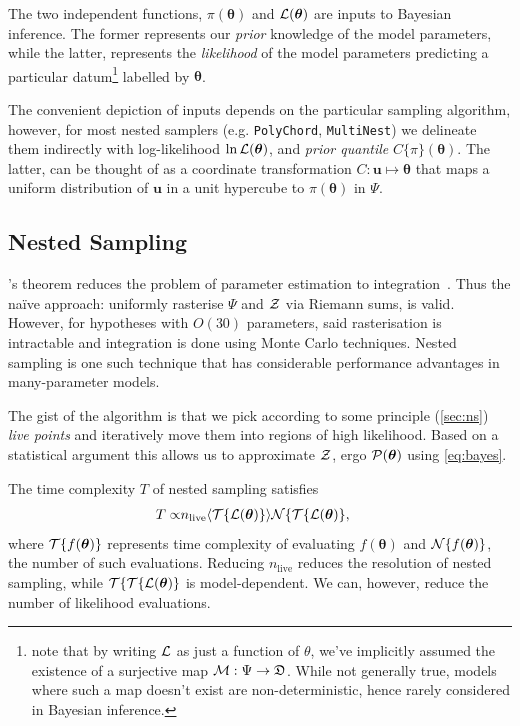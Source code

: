 \documentclass[usenatbib]{mnras}
\begin{document}
The two independent functions, \(\pi(\bm{\theta})\) and
\({\cal L}(\bm{\theta})\) are inputs to Bayesian inference. The former
represents our \emph{prior} knowledge of the model parameters, while
the latter, represents the \emph{likelihood} of the model parameters
predicting a particular datum\footnote{note that by writing ${\cal L}$
  as just a function of $\theta$, we've implicitly assumed the
  existence of a surjective map
  ${\cal M}: \Psi \rightarrow \mathfrak{D}$. While not generally true,
  models where such a map doesn't exist are non-deterministic, hence
  rarely considered in Bayesian inference. } labelled by
$\bm{\theta}$.

The convenient depiction of inputs depends on the particular sampling
algorithm, however, for most nested samplers (e.g. \texttt{PolyChord},
\texttt{MultiNest}) we delineate them indirectly with log-likelihood
\(\ln \cal L (\bm{\theta})\), and \emph{prior quantile}
\(C\{\pi\}(\bm{\theta})\). The latter, can be thought of as a
coordinate transformation $C: \bm{u} \mapsto \bm{\theta}$ that maps a
uniform distribution of $\bm{u}$ in a unit hypercube to
$\pi(\bm{\theta})$ in $\Psi$.

\subsection{Nested Sampling}\label{sec:org36366f8}

\citeauthor{1763}'s theorem reduces the problem of parameter
estimation to integration~\citep{bayes-integration}. Thus the naïve
approach: uniformly rasterise \(\Psi\) and \({\cal Z}\) via Riemann
sums, is valid. However, for hypotheses with \(O(30)\) parameters,
said rasterisation is intractable \citep{Caflisch_1998} and
integration is done using Monte Carlo techniques. Nested sampling is
one such technique that has considerable performance advantages in
many-parameter models.

The gist of the algorithm is that we pick according to some principle
(\cref{sec:ns}) \emph{live points} and iteratively move them into
regions of high likelihood. Based on a statistical argument this
allows us to approximate ${\cal Z}$, ergo ${\cal P}(\bm{\theta})$
using \cref{eq:bayes}.

The time complexity $T$ of nested sampling satisfies
\begin{subequations}\label{eq:complexity}
  \begin{align}
    T \propto & n_\text{live} \langle {\cal T}\{{\cal L}(\bm{\theta})\} \rangle {\cal N}\{{\cal T}\{{\cal L}(\bm{\theta}) \},
  \end{align}
\end{subequations}
where ${\cal T}\{f(\bm{\theta})\}$ represents time complexity of
evaluating $f(\bm{\theta})$ and ${\cal N}\{f(\bm{\theta})\}$, the
number of such evaluations. Reducing $n_\text{live}$ reduces the
resolution of nested sampling, while
${\cal T}\{ {\cal T}\{{\cal L}(\bm{\theta})\}$ is model-dependent. We
can, however, reduce the number of likelihood evaluations.
\end{document}
